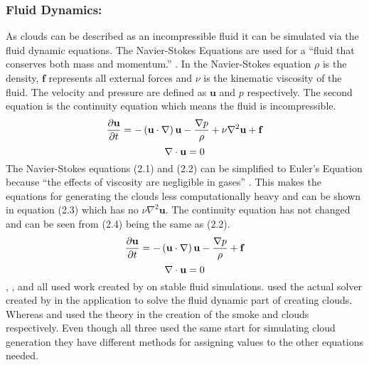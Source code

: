 \subsubsection{Fluid Dynamics:}
As clouds can be described as an incompressible fluid it can be simulated via the fluid dynamic equations.
The Navier-Stokes Equations are used for a “fluid that conserves both mass and momentum.” \citep{JStam99}.
In the Navier-Stokes equation $\rho$ is the density, $\mathbf{f}$ represents all external forces and $\nu$ is the kinematic viscosity of the fluid.
The velocity and pressure are defined as $\mathbf{u}$ and $p$ respectively.
The second equation is the continuity equation which means the fluid is incompressible.
\begin{equation} \label{eq:Navier-Stokes}
  \centering
  \frac{\partial \mathbf{u}}{\partial t}=-\left(\mathbf{u}\cdot \nabla \right)\mathbf{u}-\frac{\nabla p}{\rho}+\nu{\nabla }^{2}\mathbf{u}+\mathbf{f}
\end{equation}
\begin{equation} \label{eq:Continuity Equation}
  \centering
  \nabla\cdot\mathbf{u}=0
\end{equation}
The Navier-Stokes equations (2.1) and (2.2) can be simplified to Euler's Equation because “the effects of viscosity are negligible in gases” \citep*{Fedkiw01}.
This makes the equations for generating the clouds less computationally heavy and can be shown in equation (2.3) which has no $\nu{\nabla }^{2}\mathbf{u}$.
The continuity equation has not changed and can be seen from (2.4) being the same as (2.2).
\begin{equation} \label{eq:Euler's Equation}
  \centering
   \frac{\partial \mathbf{u}}{\partial t}=-\left(\mathbf{u}\cdot \nabla \right)\mathbf{u}-\frac{\nabla p}{\rho}+\mathbf{f}
\end{equation}
\begin{equation} \label{eq:Continuity Equation Euler}
  \centering
  \nabla\cdot\mathbf{u}=0
\end{equation}
\citet*{Fedkiw01}, \citet{HarrisEtAl03}, and \citet*{DOverby02} all used work created by \citet{JStam99} on stable fluid simulations.
\citet*{DOverby02} used the actual solver created by \citet{JStam99} in the application to solve the fluid dynamic part of creating clouds.
Whereas \citet*{Fedkiw01} and \citet{HarrisEtAl03} used the theory in the creation of the smoke and clouds respectively.
Even though all three used the same start for simulating cloud generation they have different methods for assigning values to the other equations needed. 

